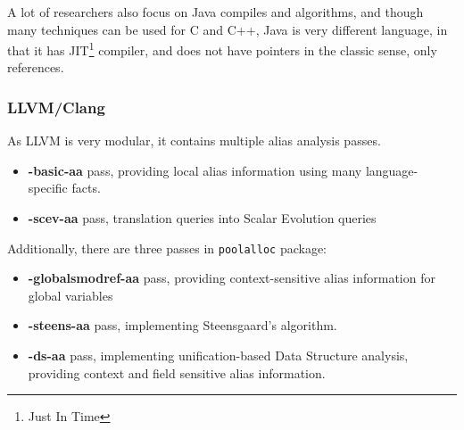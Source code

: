 A lot of researchers also focus on Java compiles and algorithms, and though many
techniques can be used for C and C++, Java is very different language, in that
it has JIT\footnote{Just In Time} compiler, and does not have pointers in the
classic sense, only references. 

\subsubsection{LLVM/Clang}

As LLVM is very modular, it contains multiple alias analysis passes. 

\begin{itemize}
	\item {\bf -basic-aa} pass, providing local alias information using many
		language-specific facts.
	\item {\bf -scev-aa} pass, translation queries into Scalar Evolution queries
\end{itemize}

Additionally, there are three passes in {\tt poolalloc} package:

\begin{itemize}
	\item {\bf -globalsmodref-aa} pass, providing context-sensitive alias
		information for global variables
	\item {\bf -steens-aa} pass, implementing Steensgaard's algorithm.
	\item {\bf -ds-aa} pass, implementing unification-based Data Structure
		analysis, providing context and field sensitive alias information.
\end{itemize}

